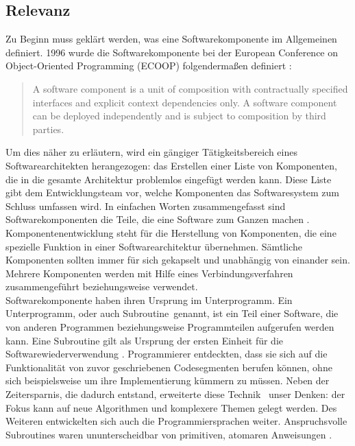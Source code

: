 \subsection{Relevanz}
\label{sec:1_Relevanz}

Zu Beginn muss geklärt werden, was eine Softwarekomponente im Allgemeinen definiert. 1996 wurde die Softwarekomponente bei der European Conference on Object-Oriented Programming (ECOOP) folgendermaßen definiert \autocite{Szyperski.2002}:
\begin{quote}
\glqq A software component is a unit of composition with contractually specified interfaces and explicit context dependencies only. A software component can be deployed independently and is subject to composition by third parties.\grqq
\end{quote}
Um dies näher zu erläutern, wird ein gängiger Tätigkeitsbereich eines Softwarearchitekten herangezogen: das Erstellen einer Liste von Komponenten, die in die gesamte Architektur problemlos eingefügt werden kann. Diese Liste gibt dem Entwicklungsteam vor, welche Komponenten das Softwaresystem zum Schluss umfassen wird. In einfachen Worten zusammengefasst sind Softwarekomponenten die Teile, die eine Software zum Ganzen machen \citereset \autocite{Szyperski.2002}.\\
Komponentenentwicklung steht für die Herstellung von Komponenten, die eine spezielle Funktion in einer Softwarearchitektur übernehmen. Sämtliche Komponenten sollten immer für sich gekapselt und unabhängig von einander sein. Mehrere Komponenten werden mit Hilfe eines Verbindungsverfahren zusammengeführt beziehungsweise verwendet. \\
Softwarekomponente haben ihren Ursprung im \glqq Unterprogramm\grqq . Ein \glqq Unterprogramm\grqq , oder auch \glqq Subroutine\grqq\ genannt, ist ein Teil einer Software, die von anderen Programmen beziehungsweise Programmteilen aufgerufen werden kann. Eine Subroutine gilt als Ursprung der ersten Einheit für die Softwarewiederverwendung \autocite{Wheeler.1985}. Programmierer entdeckten, dass sie sich auf die Funktionalität von zuvor geschriebenen Codesegmenten berufen können, ohne sich beispielsweise um ihre Implementierung kümmern zu müssen. Neben der Zeitersparnis, die dadurch entstand, erweiterte diese \glqq Technik \grqq\ unser Denken:
der Fokus kann auf neue Algorithmen und komplexere Themen gelegt werden. Des Weiteren entwickelten sich auch die Programmiersprachen weiter. Anspruchsvolle Subroutines waren ununterscheidbar von primitiven, atomaren Anweisungen \autocite{Szyperski.2002}.\\

